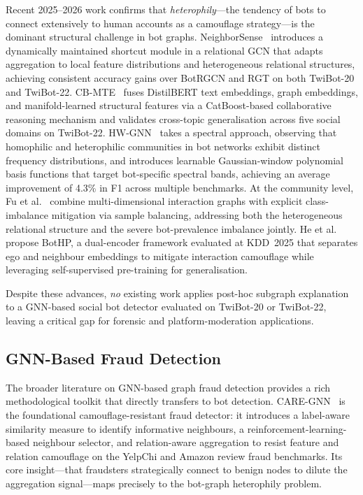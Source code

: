 Recent 2025--2026 work confirms that \emph{heterophily}---the tendency of bots to
connect extensively to human accounts as a camouflage strategy---is the dominant
structural challenge in bot graphs.
NeighborSense~\cite{li2026neighborsense} introduces a dynamically maintained
shortcut module in a relational GCN that adapts aggregation to local feature
distributions and heterogeneous relational structures, achieving consistent accuracy
gains over BotRGCN and RGT on both TwiBot-20 and TwiBot-22.
CB-MTE~\cite{cheng2025cbmte} fuses DistilBERT text embeddings, graph embeddings,
and manifold-learned structural features via a CatBoost-based collaborative
reasoning mechanism and validates cross-topic generalisation across five social
domains on TwiBot-22.
HW-GNN~\cite{liu2025hwgnn} takes a spectral approach, observing that homophilic and
heterophilic communities in bot networks exhibit distinct frequency distributions,
and introduces learnable Gaussian-window polynomial basis functions that target
bot-specific spectral bands, achieving an average improvement of 4.3\% in F1
across multiple benchmarks.
At the community level, Fu et al.~\cite{fu2026heterogeneous} combine multi-dimensional
interaction graphs with explicit class-imbalance mitigation via sample balancing,
addressing both the heterogeneous relational structure and the severe bot-prevalence
imbalance jointly.
He et al.~\cite{he2025bothp} propose BotHP, a dual-encoder framework evaluated at
KDD~2025 that separates ego and neighbour embeddings to mitigate interaction
camouflage while leveraging self-supervised pre-training for generalisation.

Despite these advances, \emph{no} existing work applies post-hoc subgraph
explanation to a GNN-based social bot detector evaluated on TwiBot-20 or TwiBot-22,
leaving a critical gap for forensic and platform-moderation applications.

\subsection{GNN-Based Fraud Detection}

The broader literature on GNN-based graph fraud detection provides a rich
methodological toolkit that directly transfers to bot detection.
CARE-GNN~\cite{dou2020caregnn} is the foundational camouflage-resistant fraud
detector: it introduces a label-aware similarity measure to identify informative
neighbours, a reinforcement-learning-based neighbour selector, and relation-aware
aggregation to resist feature and relation camouflage on the YelpChi and Amazon
review fraud benchmarks.
Its core insight---that fraudsters strategically connect to benign nodes to dilute
the aggregation signal---maps precisely to the bot-graph heterophily problem.

